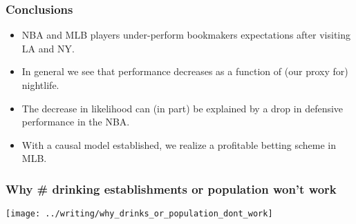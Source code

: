 \documentclass{beamer}
\begin{document}
\begin{frame}   \frametitle{Conclusions}
  \begin{itemize}
    \vspace{12pt}
    \item NBA and MLB players under-perform bookmakers expectations after visiting LA and NY.
    \vspace{12pt}
    \item In general we see that performance decreases as a function of (our proxy for) nightlife.     
    \vspace{12pt}
      \item The decrease in likelihood can (in part) be explained by a drop in defensive performance in the NBA.
    \vspace{12pt}
    \item With a causal model established, we realize a profitable betting scheme in MLB.   
  \end{itemize} 
\end{frame}

\begin{frame}   \frametitle{Why \# drinking establishments or population won't work}
  \texttt{[image: ../writing/why\_drinks\_or\_population\_dont\_work]} \end{frame}
\end{document}
